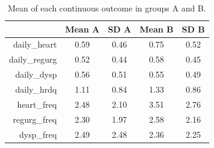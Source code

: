 \documentclass[12pt]{article}
\begin{document}
\begin{table}
\centering
\begin{tabular}{r|cc|cc}
  \hline
 & Mean A & SD A & Mean B & SD B \\ 
  \hline
daily\_heart & 0.59 & 0.46 & 0.75 & 0.52 \\ 
  daily\_regurg & 0.52 & 0.44 & 0.58 & 0.45 \\ 
  daily\_dysp & 0.56 & 0.51 & 0.55 & 0.49 \\ 
  daily\_hrdq & 1.11 & 0.84 & 1.33 & 0.86 \\ 
  heart\_freq & 2.48 & 2.10 & 3.51 & 2.76 \\ 
  regurg\_freq & 2.30 & 1.97 & 2.58 & 2.16 \\ 
  dysp\_freq & 2.49 & 2.48 & 2.36 & 2.25 \\ 
   \hline
\end{tabular}
\caption{Mean of each continuous outcome in groups A and B.} 
\label{tab:clinical_distr}
\end{table}
\end{document}
